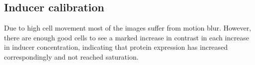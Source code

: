 \documentclass[../main.tex]{subfiles}
\begin{document}
\subsection{Inducer calibration}

Due to high cell movement most of the images suffer from motion blur. However, there are enough good cells to see a marked increase in contrast in each increase in inducer concentration, indicating that protein expression has increased correspondingly and not reached saturation.
\end{document}
